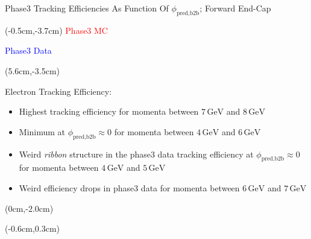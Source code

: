 \documentclass[8pt]{beamer}
\begin{document}
\begin{frame}{Phase3 Tracking Efficiencies As Function Of $\phi_{\textrm{pred,b2b}}$; Forward End-Cap}
	\begin{textblock*}{4cm}(-0.5cm,-3.7cm)
		\textcolor{red}{Phase3 MC}
		
		\textcolor{blue}{Phase3 Data}
	\end{textblock*}
	
	
	
	
	
	
	
	
	
	
	
	
	
		\pause[2]
	
	
	\begin{textblock*}{6cm}(5.6cm,-3.5cm)
		\begin{mybox}
			Electron Tracking Efficiency:
			\begin{itemize}
				\item<2-> Highest tracking efficiency for momenta between $7\,\textrm{GeV}$ and $8\,\textrm{GeV}$
				\item<3-> Minimum at $\phi_{\textrm{pred,b2b}} \approx 0$ for momenta between $4\,\textrm{GeV}$ and $6\,\textrm{GeV}$
				\item<4-> Weird \textit{ribbon} structure in the phase3 data tracking efficiency at $\phi_{\textrm{pred,b2b}} \approx 0$ for momenta between $4\,\textrm{GeV}$ and $5\,\textrm{GeV}$
				\item<5-> Weird efficiency drops in phase3 data for momenta between $6\,\textrm{GeV}$ and $7\,\textrm{GeV}$
			\end{itemize}
		\end{mybox}
	\end{textblock*}
	
	
	\begin{textblock*}{5cm}(0cm,-2.0cm)
	\end{textblock*}
	
	
	\begin{textblock*}{5cm}(-0.6cm,0.3cm)
	\end{textblock*}
	
	\pause[6]
\end{frame}
\end{document}
